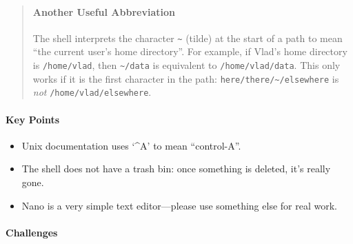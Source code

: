 \documentclass[]{book}
\begin{document}
\begin{quote}
\mbox{}\paragraph{Another Useful Abbreviation}

The shell interprets the character \texttt{\textasciitilde{}} (tilde) at
the start of a path to mean ``the current user's home directory''. For
example, if Vlad's home directory is \texttt{/home/vlad}, then
\texttt{\textasciitilde{}/data} is equivalent to
\texttt{/home/vlad/data}. This only works if it is the first character
in the path: \texttt{here/there/\textasciitilde{}/elsewhere} is
\emph{not} \texttt{/home/vlad/elsewhere}.
\end{quote}

\mbox{}\paragraph{Key Points}

\begin{itemize}
\item
  Unix documentation uses `\^{}A' to mean ``control-A''.
\item
  The shell does not have a trash bin: once something is deleted, it's
  really gone.
\item
  Nano is a very simple text editor---please use something else for real
  work.
\end{itemize}

\mbox{}\paragraph{Challenges}
\end{document}
